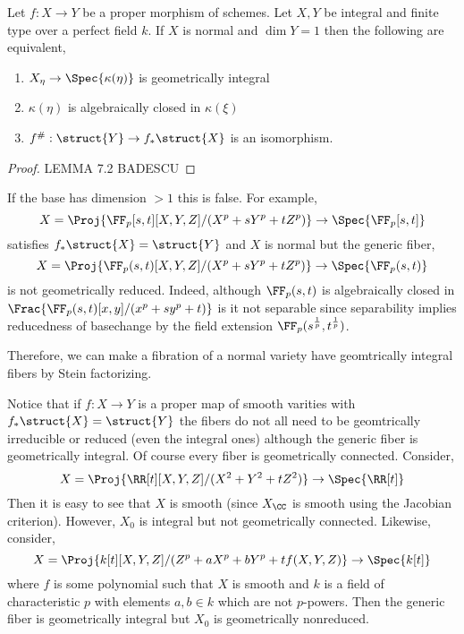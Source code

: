 \documentclass[12pt]{article}
\begin{document}
\begin{prop}
Let $f : X \to Y$ be a proper morphism of schemes. Let $X, Y$ be integral and finite type over a perfect field $k$. If $X$ is normal and $\dim{Y} = 1$ then the following are equivalent,
\begin{enumerate}
\item $X_{\eta} \to \Spec{\kappa(\eta)}$ is geometrically integral

\item $\kappa(\eta)$ is algebraically closed in $\kappa(\xi)$

\item $f^{\#} : \struct{Y} \to f_* \struct{X}$ is an isomorphism.
\end{enumerate}
\end{prop}

\begin{proof}
LEMMA 7.2 BADESCU
\end{proof}

\begin{example}
If the base has dimension $> 1$ this is false. For example, 
\[ X = \Proj{\FF_p[s,t][X,Y,Z]/(X^p + s Y^p + t Z^p)} \to \Spec{\FF_p[s,t]} \]
satisfies $f_* \struct{X} = \struct{Y}$ and $X$ is normal but the generic fiber,
\[ X = \Proj{\FF_p(s,t)[X,Y,Z]/(X^p + s Y^p + t Z^p)} \to \Spec{\FF_p(s,t)} \]
is not geometrically reduced. Indeed, although $\FF_p(s,t)$ is algebraically closed in $\Frac{\FF_p(s,t)[x,y]/(x^p + s y^p + t)}$ is it not separable since separability implies reducedness of basechange by the field extension $\FF_p(s^{\frac{1}{p}}, t^{\frac{1}{p}})$.
\end{example}

\begin{rmk}
Therefore, we can make a fibration of a normal variety have geomtrically integral fibers by Stein factorizing.
\end{rmk}

\begin{example}
Notice that if $f : X \to Y$ is a proper map of smooth varities with $f_* \struct{X} = \struct{Y}$ the fibers do not all need to be geomtrically irreducible or reduced (even the integral ones) although the generic fiber is geometrically integral. Of course every fiber is geometrically connected. Consider,
\[ X = \Proj{\RR[t][X,Y,Z]/(X^2 + Y^2 + t Z^2)} \to \Spec{\RR[t]} \]
Then it is easy to see that $X$ is smooth (since $X_{\CC}$ is smooth using the Jacobian criterion). However, $X_0$ is integral but not geometrically connected. Likewise, consider,
\[ X = \Proj{k[t][X,Y,Z]/(Z^p + a X^p + b Y^p + t f(X,Y,Z)} \to \Spec{k[t]} \]
where $f$ is some polynomial such that $X$ is smooth and $k$ is a field of characteristic $p$ with elements $a,b \in k$ which are not $p$-powers. Then the generic fiber is geometrically integral but $X_0$ is geometrically nonreduced. 
\end{example}
\end{document}
